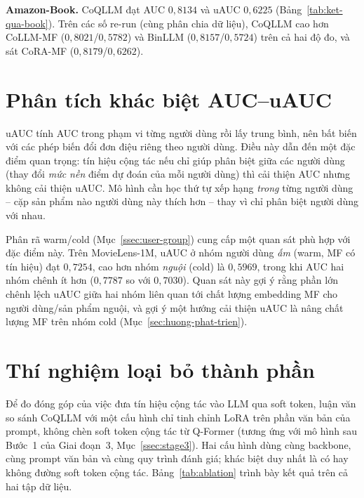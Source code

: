 \textbf{Amazon-Book.} CoQLLM đạt AUC $0{,}8134$ và uAUC $0{,}6225$ (Bảng~\ref{tab:ket-qua-book}).
Trên các số re-run (cùng phân chia dữ liệu), CoQLLM cao hơn CoLLM-MF ($0{,}8021$/$0{,}5782$) và
BinLLM ($0{,}8157$/$0{,}5724$) trên cả hai độ đo, và sát CoRA-MF ($0{,}8179$/$0{,}6262$).

\section{Phân tích khác biệt AUC--uAUC}
\label{sec:nghich-ly}

uAUC tính AUC trong phạm vi từng người dùng rồi lấy trung bình, nên bất biến với các
phép biến đổi đơn điệu riêng theo người dùng. Điều này dẫn đến một đặc điểm quan trọng:
tín hiệu cộng tác nếu chỉ giúp phân biệt giữa các người dùng (thay đổi \textit{mức nền} điểm
dự đoán của mỗi người dùng) thì cải thiện AUC nhưng không cải thiện uAUC. Mô hình cần
học thứ tự xếp hạng \textit{trong} từng người dùng -- cặp sản phẩm nào người dùng này
thích hơn -- thay vì chỉ phân biệt người dùng với nhau.

Phân rã warm/cold (Mục~\ref{ssec:user-group}) cung cấp một quan sát phù hợp với đặc điểm này.
Trên MovieLens-1M, uAUC ở nhóm người dùng \textit{ấm} (warm, MF có tín hiệu) đạt $0{,}7254$, cao
hơn nhóm \textit{nguội} (cold) là $0{,}5969$, trong khi AUC hai nhóm chênh ít hơn ($0{,}7787$ so
với $0{,}7030$). Quan sát này gợi ý rằng phần lớn chênh lệch uAUC giữa hai nhóm liên quan tới
chất lượng embedding MF cho người dùng/sản phẩm nguội, và gợi ý một hướng cải thiện uAUC là nâng
chất lượng MF trên nhóm cold (Mục~\ref{sec:huong-phat-trien}).

\section{Thí nghiệm loại bỏ thành phần}
\label{sec:ablation}

Để đo đóng góp của việc đưa tín hiệu cộng tác vào LLM qua soft token, luận văn so sánh CoQLLM
với một cấu hình chỉ tinh chỉnh LoRA trên phần văn bản của prompt, không chèn soft token cộng
tác từ Q-Former (tương ứng với mô hình sau Bước~1 của Giai đoạn~3, Mục~\ref{ssec:stage3}). Hai
cấu hình dùng cùng backbone, cùng prompt văn bản và cùng quy trình đánh giá; khác biệt duy nhất
là có hay không đường soft token cộng tác. Bảng~\ref{tab:ablation} trình bày kết quả trên cả hai
tập dữ liệu.

